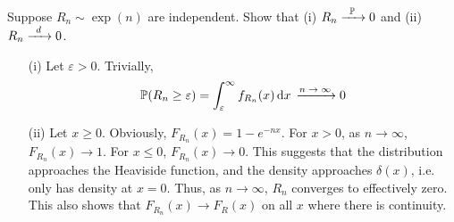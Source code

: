 \begin{example}
    Suppose $R_n \sim \exp(n)$ are independent. Show that (i) $R_n \ce{->[$\probability$]} 0$ and (ii) $R_n \ce{->[$d$]} 0$.
\end{example}
\begin{solution}
    \begin{enumerate}
        \item[(i)] Let $\varepsilon > 0$. Trivially,
        \begin{align}
            \probability(R_n \ge \varepsilon) = \int_\varepsilon^\infty f_{R_n}(x) \dd{x} \ce{->[$n \to \infty$]} 0
        \end{align}
        \item[(ii)] Let $x \ge 0$. Obviously, $F_{R_n}(x) = 1 - e^{-nx}$. For $x > 0$, as $n \to \infty$, $F_{R_n}(x) \to 1$. For $x \le 0$, $F_{R_n}(x) \to 0$. This suggests that the distribution approaches the Heaviside function, and the density approaches $\delta(x)$, i.e. only has density at $x = 0$. Thus, as $n \to \infty$, $R_n$ converges to effectively zero. This also shows that $F_{R_n}(x) \to F_R(x)$ on all $x$ where there is continuity.
    \end{enumerate}
\end{solution}


